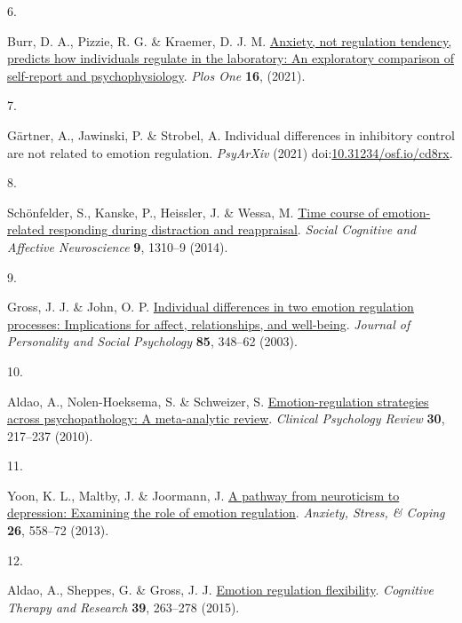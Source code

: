 \documentclass[
  man,floatsintext]{apa6}
\newlength{\cslhangindent}
\newlength{\csllabelwidth}
\newlength{\cslentryspacingunit} %
\newenvironment{CSLReferences}[2] %
 {%
  \setlength{\parindent}{0pt}
  \ifodd #1
  \let\oldpar\par
  \def\par{\hangindent=\cslhangindent\oldpar}
  \fi
  \setlength{\parskip}{#2\cslentryspacingunit}
 }%
 {}
\newcommand{\CSLLeftMargin}[1]{\parbox[t]{\csllabelwidth}{#1}}
\newcommand{\CSLRightInline}[1]{\parbox[t]{\linewidth - \csllabelwidth}{#1}\break}
\begin{document}
\begin{CSLReferences}{0}{0}
\leavevmode{}%
\CSLLeftMargin{6. }%
\CSLRightInline{Burr, D. A., Pizzie, R. G. \& Kraemer, D. J. M. \href{https://doi.org/ARTN\%20e0247246\%0A10.1371/journal.pone.0247246}{Anxiety, not regulation tendency, predicts how individuals regulate in the laboratory: An exploratory comparison of self-report and psychophysiology}. \emph{Plos One} \textbf{16}, (2021).}

\leavevmode{}%
\CSLLeftMargin{7. }%
\CSLRightInline{Gärtner, A., Jawinski, P. \& Strobel, A. Individual differences in inhibitory control are not related to emotion regulation. \emph{PsyArXiv} (2021) doi:\href{https://doi.org/10.31234/osf.io/cd8rx}{10.31234/osf.io/cd8rx}.}

\leavevmode{}%
\CSLLeftMargin{8. }%
\CSLRightInline{Schönfelder, S., Kanske, P., Heissler, J. \& Wessa, M. \href{https://doi.org/10.1093/scan/nst116}{Time course of emotion-related responding during distraction and reappraisal}. \emph{Social Cognitive and Affective Neuroscience} \textbf{9}, 1310--9 (2014).}

\leavevmode{}%
\CSLLeftMargin{9. }%
\CSLRightInline{Gross, J. J. \& John, O. P. \href{https://doi.org/10.1037/0022-3514.85.2.348}{Individual differences in two emotion regulation processes: Implications for affect, relationships, and well-being}. \emph{Journal of Personality and Social Psychology} \textbf{85}, 348--62 (2003).}

\leavevmode{}%
\CSLLeftMargin{10. }%
\CSLRightInline{Aldao, A., Nolen-Hoeksema, S. \& Schweizer, S. \href{https://doi.org/10.1016/j.cpr.2009.11.004}{Emotion-regulation strategies across psychopathology: A meta-analytic review}. \emph{Clinical Psychology Review} \textbf{30}, 217--237 (2010).}

\leavevmode{}%
\CSLLeftMargin{11. }%
\CSLRightInline{Yoon, K. L., Maltby, J. \& Joormann, J. \href{https://doi.org/10.1080/10615806.2012.734810}{A pathway from neuroticism to depression: Examining the role of emotion regulation}. \emph{Anxiety, Stress, \& Coping} \textbf{26}, 558--72 (2013).}

\leavevmode{}%
\CSLLeftMargin{12. }%
\CSLRightInline{Aldao, A., Sheppes, G. \& Gross, J. J. \href{https://doi.org/10.1007/s10608-014-9662-4}{Emotion regulation flexibility}. \emph{Cognitive Therapy and Research} \textbf{39}, 263--278 (2015).}


\end{CSLReferences}
\end{document}
